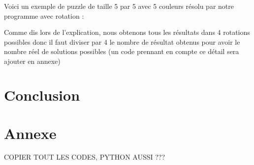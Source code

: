 \documentclass[12pt, openany]{report}
\begin{document}
Voici un exemple de puzzle de taille 5 par 5 avec 5 couleurs résolu
par notre programme avec rotation :
\begin{verbnobox}\fontsize{7pt}{7pt}\selectfont
\end{verbnobox}
Comme dis lors de l'explication, nous obtenons tous les résultats dans 4 rotations possibles donc il faut diviser par 4 le nombre de résultat obtenus pour avoir le nombre réel de solutions possibles (un code prennant en compte ce détail sera ajouter en annexe)










\section*{Conclusion}

\section*{Annexe}

COPIER TOUT LES CODES, PYTHON AUSSI ???
\end{document}
